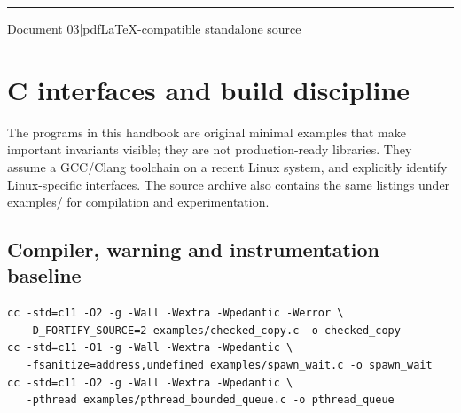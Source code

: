 \documentclass[11pt,letterpaper,oneside]{report}
\begin{document}
\hypersetup{pageanchor=false}%
\begin{titlepage}\centering{}\vspace{0.6cm}{\Large Reference patterns with complete reproducible programs\par}\vspace{2cm}\rule{0.75\textwidth}{1.2pt}\par\vspace{0.55cm}{\large An original companion to Michael Kerrisk\textquotesingle s 2010 text}\par\vspace{0.3cm}{\large Edition 1.0\quad |\quad October 2026}\par\vfill{\small Document 03\quad |\quad pdfLaTeX-compatible standalone source}\par\end{titlepage}\hypersetup{pageanchor=true}
\tableofcontents\clearpage
\chapter{C interfaces and build discipline}
The programs in this handbook are original minimal examples that make important invariants visible; they are not production-ready libraries. They assume a GCC/Clang toolchain on a recent Linux system, and explicitly identify Linux-specific interfaces. The source archive also contains the same listings under examples/ for compilation and experimentation.

\section{Compiler, warning and instrumentation baseline}
\begin{lstlisting}
cc -std=c11 -O2 -g -Wall -Wextra -Wpedantic -Werror \
   -D_FORTIFY_SOURCE=2 examples/checked_copy.c -o checked_copy
cc -std=c11 -O1 -g -Wall -Wextra -Wpedantic \
   -fsanitize=address,undefined examples/spawn_wait.c -o spawn_wait
cc -std=c11 -O2 -g -Wall -Wextra -Wpedantic \
   -pthread examples/pthread_bounded_queue.c -o pthread_queue
\end{lstlisting}
\end{document}
